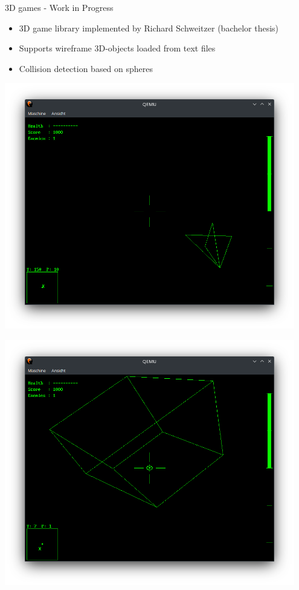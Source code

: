 \begin{frame}{3D games - Work in Progress}
	\begin{itemize}
		\setlength\itemsep{1em}
		\item 3D game library implemented by Richard Schweitzer (bachelor thesis)
		\item Supports wireframe 3D-objects loaded from text files
		\item Collision detection based on spheres
	\end{itemize}
	\begin{minipage}{0.49\textwidth}
		\includegraphics[width=0.95\textwidth]{img/battlezone1}
	\end{minipage}
	\begin{minipage}{0.49\textwidth}
		\includegraphics[width=0.95\textwidth]{img/battlezone2}
	\end{minipage}
\end{frame}
